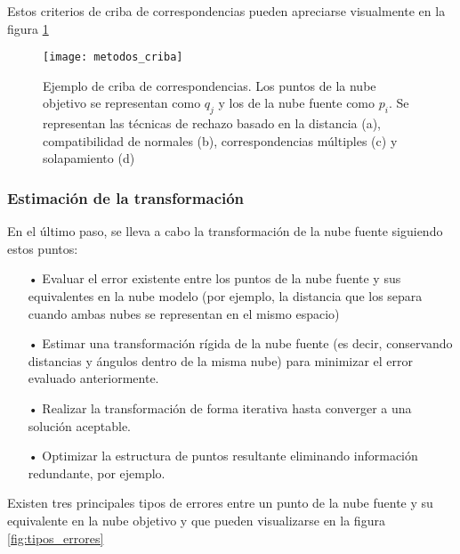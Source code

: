 Estos criterios de criba de correspondencias pueden apreciarse visualmente en la figura \ref{fig:metodos_criba}

\begin{figure}
\centering
\texttt{[image: metodos\_criba]}
\caption{Ejemplo de criba de correspondencias. Los puntos de la nube objetivo se representan como $q_j$ y los de la nube fuente como $p_i$. Se representan las técnicas de rechazo basado en la distancia (a), compatibilidad de normales (b), correspondencias múltiples (c) y solapamiento (d)}\label{fig:metodos_criba}
\end{figure}

\subsubsection{Estimación de la transformación}
En el último paso, se lleva a cabo la transformación de la nube fuente siguiendo estos puntos\cite{paper_registration}:

\begin{itemize}
\item[•]Evaluar el error existente entre los puntos de la nube fuente y sus equivalentes en la nube modelo (por ejemplo, la distancia que los separa cuando ambas nubes se representan en el mismo espacio)
\item[•]Estimar una transformación rígida de la nube fuente (es decir, conservando distancias y ángulos dentro de la misma nube) para minimizar el error evaluado anteriormente.
\item[•]Realizar la transformación de forma iterativa hasta converger a una solución aceptable.
\item[•]Optimizar la estructura de puntos resultante eliminando información redundante, por ejemplo.
\end{itemize}

Existen tres principales tipos de errores\cite{paper_registration} entre un punto de la nube fuente y su equivalente en la nube objetivo y que pueden visualizarse en la figura \ref{fig:tipos_errores} 

